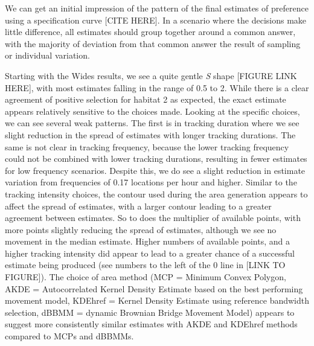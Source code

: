 \documentclass[10pt,a4paper]{article}
\begin{document}
We can get an initial impression of the pattern of the final estimates of preference using a specification curve {[}CITE HERE{]}.
In a scenario where the decisions make little difference, all estimates should group together around a common answer, with the majority of deviation from that common answer the result of sampling or individual variation.

Starting with the Wides results, we see a quite gentle \emph{S} shape {[}FIGURE LINK HERE{]}, with most estimates falling in the range of 0.5 to 2.
While there is a clear agreement of positive selection for habitat 2 as expected, the exact estimate appears relatively sensitive to the choices made.
Looking at the specific choices, we can see several weak patterns.
The first is in tracking duration where we see slight reduction in the spread of estimates with longer tracking durations.
The same is not clear in tracking frequency, because the lower tracking frequency could not be combined with lower tracking durations, resulting in fewer estimates for low frequency scenarios.
Despite this, we do see a slight reduction in estimate variation from frequencies of 0.17 locations per hour and higher.
Similar to the tracking intensity choices, the contour used during the area generation appears to affect the spread of estimates, with a larger contour leading to a greater agreement between estimates.
So to does the multiplier of available points, with more points slightly reducing the spread of estimates, although we see no movement in the median estimate.
Higher numbers of available points, and a higher tracking intensity did appear to lead to a greater chance of a successful estimate being produced (see numbers to the left of the 0 line in {[}LINK TO FIGURE{]}).
The choice of area method (MCP = Minimum Convex Polygon, AKDE = Autocorrelated Kernel Density Estimate based on the best performing movement model, KDEhref = Kernel Density Estimate using reference bandwidth selection, dBBMM = dynamic Brownian Bridge Movement Model) appears to suggest more consistently similar estimates with AKDE and KDEhref methods compared to MCPs and dBBMMs.
\end{document}
